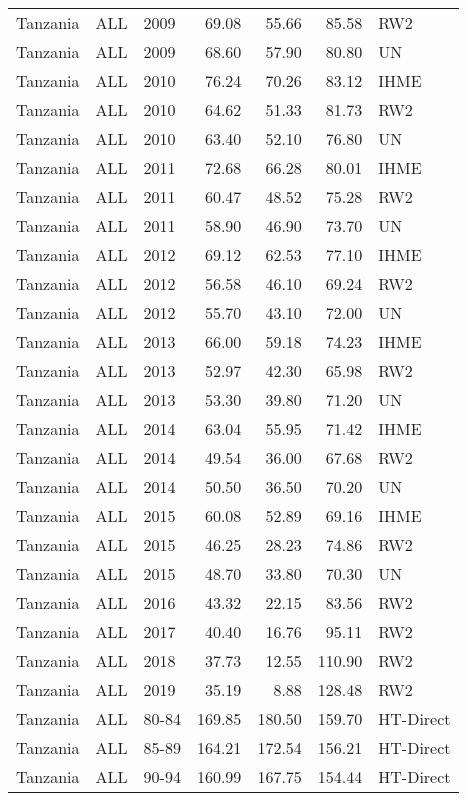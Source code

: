 \begin{longtable}{lllrrrl}
  Tanzania & ALL & 2009 & 69.08 & 55.66 & 85.58 & RW2 \\ 
  Tanzania & ALL & 2009 & 68.60 & 57.90 & 80.80 & UN \\ 
  Tanzania & ALL & 2010 & 76.24 & 70.26 & 83.12 & IHME \\ 
  Tanzania & ALL & 2010 & 64.62 & 51.33 & 81.73 & RW2 \\ 
  Tanzania & ALL & 2010 & 63.40 & 52.10 & 76.80 & UN \\ 
  Tanzania & ALL & 2011 & 72.68 & 66.28 & 80.01 & IHME \\ 
  Tanzania & ALL & 2011 & 60.47 & 48.52 & 75.28 & RW2 \\ 
  Tanzania & ALL & 2011 & 58.90 & 46.90 & 73.70 & UN \\ 
  Tanzania & ALL & 2012 & 69.12 & 62.53 & 77.10 & IHME \\ 
  Tanzania & ALL & 2012 & 56.58 & 46.10 & 69.24 & RW2 \\ 
  Tanzania & ALL & 2012 & 55.70 & 43.10 & 72.00 & UN \\ 
  Tanzania & ALL & 2013 & 66.00 & 59.18 & 74.23 & IHME \\ 
  Tanzania & ALL & 2013 & 52.97 & 42.30 & 65.98 & RW2 \\ 
  Tanzania & ALL & 2013 & 53.30 & 39.80 & 71.20 & UN \\ 
  Tanzania & ALL & 2014 & 63.04 & 55.95 & 71.42 & IHME \\ 
  Tanzania & ALL & 2014 & 49.54 & 36.00 & 67.68 & RW2 \\ 
  Tanzania & ALL & 2014 & 50.50 & 36.50 & 70.20 & UN \\ 
  Tanzania & ALL & 2015 & 60.08 & 52.89 & 69.16 & IHME \\ 
  Tanzania & ALL & 2015 & 46.25 & 28.23 & 74.86 & RW2 \\ 
  Tanzania & ALL & 2015 & 48.70 & 33.80 & 70.30 & UN \\ 
  Tanzania & ALL & 2016 & 43.32 & 22.15 & 83.56 & RW2 \\ 
  Tanzania & ALL & 2017 & 40.40 & 16.76 & 95.11 & RW2 \\ 
  Tanzania & ALL & 2018 & 37.73 & 12.55 & 110.90 & RW2 \\ 
  Tanzania & ALL & 2019 & 35.19 & 8.88 & 128.48 & RW2 \\ 
  Tanzania & ALL & 80-84 & 169.85 & 180.50 & 159.70 & HT-Direct \\ 
  Tanzania & ALL & 85-89 & 164.21 & 172.54 & 156.21 & HT-Direct \\ 
  Tanzania & ALL & 90-94 & 160.99 & 167.75 & 154.44 & HT-Direct \\ 

\end{longtable}

